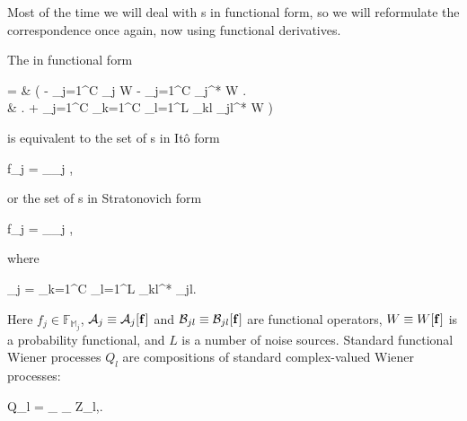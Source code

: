 Most of the time we will deal with s in functional form, so we will reformulate the correspondence once again, now using functional derivatives.

\begin{theorem}
\label{thm:fpe-sde:corr:fpe-sde-func}
	The  in functional form
	\begin{eqn*}
		={} & \int \upd\xvec \left(
			- \sum_{j=1}^C  _j W
			- \sum_{j=1}^C  _j^* W \right. \\
		& \left. + \sum_{j=1}^C \sum_{k=1}^C 
				\sum_{l=1}^L \mathcal{B}_{kl} _{jl}^* W
		\right)
	\end{eqn*}
	is equivalent to the set of s in It\^{o} form
	\begin{eqn*}
		\upd f_j = _{\restbasis_j} \left[
			\mathcal{A}_j \upd t
			+ \sum_{l=1}^L _{jl} \upd Q_l
		\right],
	\end{eqn*}
	or the set of s in Stratonovich form
	\begin{eqn*}
		\upd f_j = _{\restbasis_j} \left[
			(\mathcal{A}_j - \mathcal{S}_j) \upd t
			+ \sum_{l=1}^L \mathcal{B}_{jl} \upd Q_l
		\right],
	\end{eqn*}
	where
	\begin{eqn*}
		_j =  \sum_{k=1}^C \sum_{l=1}^L
			\mathcal{B}_{kl}^*
			\frac{\fdelta}{\fdelta f_k^*}
			\mathcal{B}_{jl}.
	\end{eqn*}
	Here $f_j \in \mathbb{F}_{\mathbb{M}_j}$, $\mathcal{A}_j \equiv \mathcal{A}_j[\mathbf{f}]$ and $\mathcal{B}_{jl} \equiv \mathcal{B}_{jl}[\mathbf{f}]$ are functional operators, $W \equiv W[\mathbf{f}]$ is a probability functional, and $L$ is a number of noise sources.
	Standard functional Wiener processes $Q_l$ are compositions of standard complex-valued Wiener processes:
	\begin{eqn*}
		Q_l = \sum_{\nvec \in \fullbasis} \phi_{\nvec} Z_{l,\nvec}.
	\end{eqn*}
\end{theorem}
